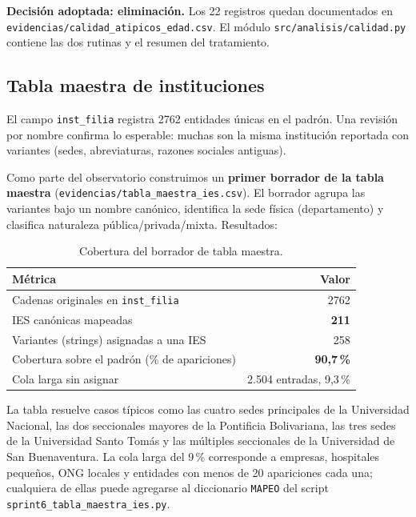 \documentclass[11pt,a4paper,oneside]{article}
\begin{document}
\textbf{Decisión adoptada: eliminación.} Los 22 registros quedan documentados en \texttt{evidencias/calidad\_atipicos\_edad.csv}. El módulo \texttt{src/analisis/calidad.py} contiene las dos rutinas y el resumen del tratamiento.

\subsection{Tabla maestra de instituciones}\label{ssec:tabla-maestra}

El campo \texttt{inst\_filia} registra \num{2762} entidades únicas en el padrón. Una revisión por nombre confirma lo esperable: muchas son la misma institución reportada con variantes (sedes, abreviaturas, razones sociales antiguas).

Como parte del observatorio construimos un \textbf{primer borrador de la tabla maestra} (\texttt{evidencias/tabla\_maestra\_ies.csv}). El borrador agrupa las variantes bajo un nombre canónico, identifica la sede física (departamento) y clasifica naturaleza pública/privada/mixta. Resultados:

\begin{table}[h]
\centering
\caption{Cobertura del borrador de tabla maestra.}
\small
\begin{tabular}{l r}
\toprule
\textbf{Métrica} & \textbf{Valor} \\
\midrule
Cadenas originales en \texttt{inst\_filia} & \num{2762} \\
IES canónicas mapeadas & \textbf{211} \\
Variantes (strings) asignadas a una IES & 258 \\
Cobertura sobre el padrón (\% de apariciones) & \textbf{90{,}7\,\%} \\
Cola larga sin asignar & 2.504 entradas, 9{,}3\,\% \\
\bottomrule
\end{tabular}
\end{table}

La tabla resuelve casos típicos como las cuatro sedes principales de la Universidad Nacional, las dos seccionales mayores de la Pontificia Bolivariana, las tres sedes de la Universidad Santo Tomás y las múltiples seccionales de la Universidad de San Buenaventura. La cola larga del 9\,\% corresponde a empresas, hospitales pequeños, ONG locales y entidades con menos de 20 apariciones cada una; cualquiera de ellas puede agregarse al diccionario \texttt{MAPEO} del script \texttt{sprint6\_tabla\_maestra\_ies.py}.
\end{document}
